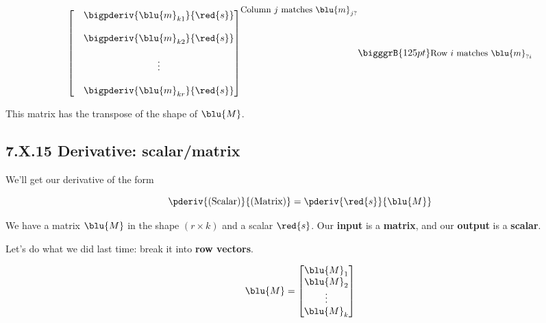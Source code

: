 \begin{definition}
\begin{equation*}
{\begin{bmatrix}
                        &
                        \begin{matrix}
                            \bigpderiv{ \blu{m}_{k1} }   { \red{s} }\\ 
                            \\
                            \bigpderiv{ \blu{m}_{k2} }   { \red{s} }\\ 
                            \\
                            \vdots \\ 
                            \\
                            \bigpderiv{ \blu{m}_{kr} }   { \red{s} }
                        \end{matrix}
                    \end{bmatrix}
                }^{ \text{\small Column $j$ matches $\blu{m}_{j?}$} }
                \bigggrB{125pt} \text{\small Row $i$ matches $\blu{m}_{?i}$} 
            \end{equation*}
            
            This matrix has the transpose of the shape of $\blu{M}$.
        \end{definition}
    
    \secdiv
        
    \subsection*{7.X.15 \quad Derivative: scalar/matrix}
    
        We'll get our derivative of the form 
        
        \begin{equation}
            \pderiv{ \text{(Scalar)} } { \text{(Matrix)} } 
            =
            \pderiv{ \red{s} }{ \blu{M} } 
        \end{equation}
        
        We have a matrix $\blu{M}$ in the shape $(r \times k)$ and a scalar $\red{s}$. Our \textbf{input} is a \textbf{matrix}, and our \textbf{output} is a \textbf{scalar}.
        
        Let's do what we did last time: break it into \textbf{row vectors}.
        
        \begin{equation}
            \blu{M}
            =
            \begin{bmatrix}
                \blu{M}_1 \\ \blu{M}_2 \\ \vdots \\ \blu{M}_k
            \end{bmatrix}
        \end{equation}
        
